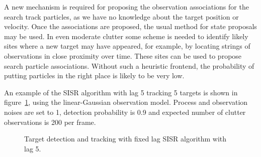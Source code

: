 A new mechanism is required for proposing the observation associations for the search track particles, as we have no knowledge about the target position or velocity. Once the associations are proposed, the usual method for state proposals may be used. In even moderate clutter some scheme is needed to identify likely sites where a new target may have appeared, for example, by locating strings of observations in close proximity over time. These sites can be used to propose search particle associations. Without such a heuristic frontend, the probability of putting particles in the right place is likely to be very low.

An example of the SISR algorithm with lag 5 tracking 5 targets is shown in figure~\ref{fig:DetectionTracking}, using the linear-Gaussian observation model. Process and observation noises are set to 1, detection probability is 0.9 and expected number of clutter observations is 200 per frame.

\begin{figure} \centering
{}
\caption{Target detection and tracking with fixed lag SISR algorithm with lag 5.}%
\label{fig:DetectionTracking}%
\end{figure}
